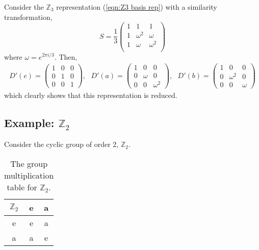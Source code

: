 Consider the $\mathbb{Z}_3$ representation (\ref{eqn:Z3 basis rep}) with a similarity transformation, 
\begin{equation}
    S = \frac{1}{3}\begin{pmatrix}
        1 & 1 & 1 \\
        1 & \omega^2 & \omega\\
        1 & \omega & \omega^2\\
    \end{pmatrix}
\end{equation}
where $\omega = e^{2\pi i/3}$. Then, 
\begin{eqnarray}\label{eqn:irrep-constructed}
    D'(e) = \begin{pmatrix}
        1 & 0 & 0\\
        0 & 1 & 0\\
        0 & 0 & 1
    \end{pmatrix}, \ \ \ 
    D'(a) = \begin{pmatrix}
        1 & 0 & 0\\
        0 & \omega & 0\\
        0 & 0 & \omega^2
    \end{pmatrix}, \ \ \
    D'(b) = \begin{pmatrix}
        1 & 0 & 0\\
        0 & \omega^2 & 0\\
        0 & 0 & \omega
    \end{pmatrix}
\end{eqnarray}
which clearly shows that this representation is reduced. 
\subsection{Example: $\mathbb{Z}_2$}
Consider the cyclic group of order 2, $\mathbb{Z}_2$. 

\begin{table}
    \centering
    \begin{tabular}{|c|c|c|}
       \hline
         $\mathbb{Z}_2$& e & a  \\
       \hline
       e & e & a \\
       \hline
       a & a & e \\
       \hline
    \end{tabular}
    \label{table:z2}
    \caption{The group multiplication table for $\mathbb{Z}_2$.}
\end{table}


